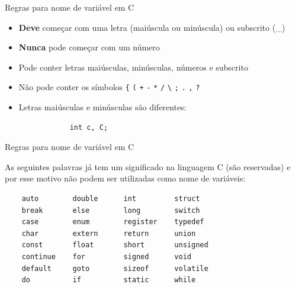 \documentclass[handout]{beamer}
\begin{document}
\begin{frame}[fragile]{Regras para nome de variável em C}

    \begin{itemize}[<+->]
        \item \textbf{Deve} começar com uma letra (maiúscula ou minúscula) ou subscrito (\_)
        \item \textbf{Nunca} pode começar com um número
        \item Pode conter letras maiúsculas, minúsculas, números e subscrito
        \item Não pode conter os símbolos \texttt{\{} \texttt{(} \texttt{+} \texttt{-} \texttt{*} \texttt{/} \texttt{\textbackslash} \texttt{;} \texttt{.} \texttt{,} \texttt{?}
        \item Letras maiúsculas e minúsculas são diferentes:
        \begin{verbatim}
            int c, C;
        \end{verbatim}
    \end{itemize}
\end{frame}

\begin{frame}[fragile]{Regras para nome de variável em C}

    As seguintes palavras já tem um significado na linguagem C (são reservadas) e por esse motivo não podem ser utilizadas como nome de variáveis:
    
    \begin{verbatim}
    auto        double      int         struct
    break       else        long        switch
    case        enum        register    typedef
    char        extern      return      union
    const       float       short       unsigned
    continue    for         signed      void
    default     goto        sizeof      volatile
    do          if          static      while
    \end{verbatim}

\end{frame}

\end{document}
